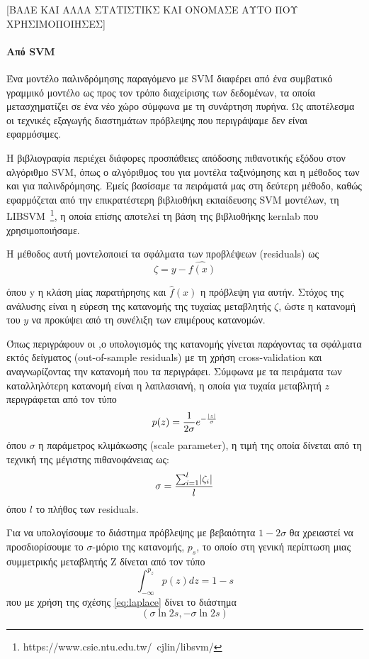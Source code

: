 [ΒΑΛΕ ΚΑΙ ΑΛΛΑ ΣΤΑΤΙΣΤΙΚΣ ΚΑΙ ΟΝΟΜΑΣΕ ΑΥΤΟ ΠΟΥ ΧΡΗΣΙΜΟΠΟΙΗΣΕΣ]

\paragraph{Από SVM} Ένα μοντέλο παλινδρόμησης παραγόμενο με SVM διαφέρει από ένα συμβατικό γραμμικό μοντέλο ως προς τον τρόπο διαχείρισης των δεδομένων, τα οποία μετασχηματίζει σε ένα νέο χώρο σύμφωνα με τη συνάρτηση πυρήνα. Ως αποτέλεσμα οι τεχνικές εξαγωγής διαστημάτων πρόβλεψης που περιγράψαμε δεν είναι εφαρμόσιμες.

Η βιβλιογραφία περιέχει διάφορες προσπάθειες απόδοσης πιθανοτικής εξόδου στον αλγόριθμο SVM, όπως ο αλγόριθμος του \citet{Platt99probabilisticoutputs} για μοντέλα ταξινόμησης και η μέθοδος των \citet{Jiang:2008:ECI:1390681.1390698} και \citet{Lin04simpleprobabilistic} για παλινδρόμησης. Εμείς βασίσαμε τα πειράματά μας στη δεύτερη μέθοδο, καθώς εφαρμόζεται από την επικρατέστερη βιβλιοθήκη εκπαίδευσης SVM μοντέλων, τη LIBSVM~\footnote{https://www.csie.ntu.edu.tw/~cjlin/libsvm/}, η οποία επίσης αποτελεί τη βάση της βιβλιοθήκης kernlab που χρησιμοποιήσαμε.

Η μέθοδος αυτή μοντελοποιεί τα σφάλματα των προβλέψεων (residuals) ως
\begin{equation}
\zeta = y - \hat{f(x)}
\end{equation}

όπου y η κλάση μίας παρατήρησης και $\hat{f}(x)$ η πρόβλεψη για αυτήν. Στόχος της ανάλυσης είναι η εύρεση της κατανομής της τυχαίας μεταβλητής $\zeta$, ώστε η κατανομή του $y$ να προκύψει από τη συνέλιξη των επιμέρους κατανομών. 

Όπως περιγράφουν οι \citet{Chang:2011:LLS:1961189.1961199} ,ο υπολογισμός της κατανομής γίνεται παράγοντας τα σφάλματα εκτός δείγματος (out-of-sample residuals) με τη χρήση cross-validation και αναγνωρίζοντας την κατανομή που τα περιγράφει. Σύμφωνα με τα πειράματα των \citet{Lin04simpleprobabilistic} καταλληλότερη κατανομή είναι η λαπλασιανή, η οποία για τυχαία μεταβλητή $z$ περιγράφεται από τον τύπο
\begin{equation}
	p(z) = \frac{1}{2\sigma} e^{-\frac{\lvert z\rvert}{\sigma}}
	\label{eq:laplace}
\end{equation} 
όπου $\sigma$ η παράμετρος κλιμάκωσης (scale parameter), η τιμή της οποία δίνεται από τη τεχνική της μέγιστης πιθανοφάνειας ως:
\begin{equation}
\sigma = \frac{\sum_{i=1}^{l} \lvert\zeta_{i}\rvert}{l}
\end{equation}
όπου $l$ το πλήθος των residuals.

Για να υπολογίσουμε το διάστημα πρόβλεψης με βεβαιότητα $1-2\sigma$ θα χρειαστεί να προσδιορίσουμε το $\sigma$-μόριο της κατανομής, $p_s$, το οποίο στη γενική περίπτωση μιας συμμετρικής μεταβλητής Z δίνεται από τον τύπο
\begin{equation}
\int_{-\infty}^{p_z}p(z)dz = 1-s
\end{equation}
που με χρήση της σχέσης \ref{eq:laplace} δίνει το διάστημα
\begin{equation}
	(\sigma \ln{2 s}, -\sigma \ln{2 s})
\end{equation}
